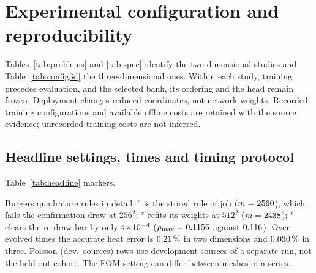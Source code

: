 \section{Experimental configuration and reproducibility}
\label{app:training-schedule}\label{app:provenance}
Tables~\ref{tab:problems} and \ref{tab:spec} identify the two-dimensional
studies and Table~\ref{tab:config3d} the three-dimensional ones. Within each study,
training precedes evaluation, and the selected bank, its ordering and the
head remain frozen. Deployment changes reduced coordinates, not
network weights. Recorded training configurations and available offline
costs are retained with the source evidence; unrecorded training costs
are not inferred.


\begin{table}[htbp]
\centering
\caption{Training configurations of the frozen checkpoints, transcribed from
the committed configuration and code files of each study (paths and
SHA256 in \texttt{evidence/training-configs-2026-09-21}).}
\label{tab:training-all}
\resizebox{\linewidth}{!}{}
\end{table}



\begin{table}[htbp]
\centering
\caption{Problem specification. Cohort and reduced sizes are read from the run
configurations where recorded; rows describe their recorded development,
validation and held-out cohorts.}
\label{tab:problems}
\resizebox{\linewidth}{!}{}
\end{table}

\begin{table}[htbp]
\centering
\caption{Sampled problem families, transcribed from the generator sources named
in the last column (code constants, not run outputs).}
\label{tab:spec}
\resizebox{\linewidth}{!}{}
\end{table}


\subsection{Headline settings, times and timing protocol}
\label{app:cg-current}\label{app:main-experiment-details}
Table~\ref{tab:headline} markers.

Burgers quadrature rules in detail: $^{s}$ is the stored rule of job
\provEqtopLadderJob{} ($m=2560$), which fails the confirmation
draw at $256^2$; $^{x}$ refits its weights at $512^2$
($m=2438$); $^{\ell}$ clears the re-draw bar by only
$4{\times}10^{-4}$ ($\rho_{\max}=0.1156$ against $0.116$).
Over evolved times the accurate heat error is
$0.21\,\%$ in two dimensions and
$0.030\,\%$ in three. Poisson (dev.\ sources) rows
use development sources of a separate run, not the held-out cohort. The
FOM setting can differ between meshes of a series.

